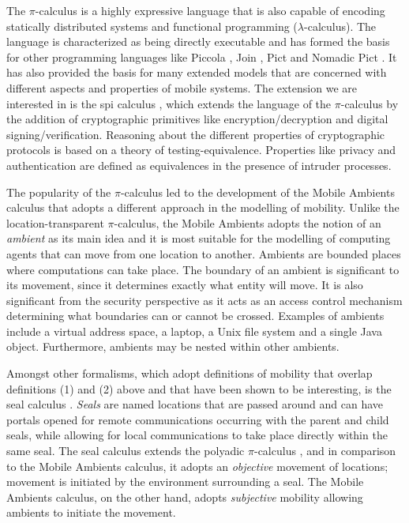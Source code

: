 \documentclass[10pt,a4paper,final,oneside,fleqn]{book}
\begin{document}
The $\pi$-calculus is a highly expressive language that is also capable of encoding statically distributed systems and functional programming ($\lambda$-calculus).  The language is characterized as being directly executable and has formed the basis for other programming languages like Piccola \cite{achermann1}, Join \cite{fournet1}, Pict \cite{pierce1} and Nomadic Pict \cite{woj1}.  It has also provided the basis for many extended models that are concerned with different aspects and properties of mobile systems.  The extension we are interested in is the spi calculus \cite{abadi1}, which extends the language of the $\pi$-calculus by the addition of cryptographic primitives like encryption/decryption and digital signing/verification.  Reasoning about the different properties of cryptographic protocols is based on a theory of testing-equivalence.  Properties like privacy and authentication are defined as equivalences in the presence of intruder processes.

The popularity of the $\pi$-calculus led to the development of the Mobile Ambients calculus that adopts a different approach in the modelling of mobility.  Unlike the location-transparent $\pi$-calculus, the Mobile Ambients adopts the notion of an {\itshape ambient\/} as its main idea and it is most suitable for the modelling of computing agents that can move from one location to another.  Ambients are bounded places where computations can take place.  The boundary of an ambient is significant to its movement, since it determines exactly what entity will move.  It is also significant from the security perspective as it acts as an access control mechanism determining what boundaries can or cannot be crossed.  Examples of ambients include a virtual address space, a laptop, a Unix file system and a single Java object.  Furthermore, ambients may be nested within other ambients.

Amongst other formalisms, which adopt definitions of mobility that overlap definitions (1) and (2) above and that have been shown to be interesting, is the seal calculus \cite{vitek1}.  {\itshape Seals\/} are named locations that are passed around and can have portals opened for remote communications occurring with the parent and child seals, while allowing for local communications to take place directly within the same seal.  The seal calculus extends the polyadic $\pi$-calculus \cite{milner4}, and in comparison to the Mobile Ambients calculus, it adopts an {\itshape objective\/} movement of locations; movement is initiated by the environment surrounding a seal.  The Mobile Ambients calculus, on the other hand, adopts {\itshape subjective\/} mobility allowing ambients to initiate the movement.
\end{document}
